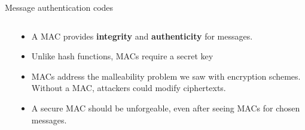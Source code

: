 \documentclass[aspectratio=169, lualatex, handout]{beamer}
\begin{document}
\begin{frame}{Message authentication codes}
	\begin{columns}[c]
		\begin{column}{0.5\textwidth}
		\end{column}
		\begin{column}{0.5\textwidth}
			\begin{itemize}
				\item A MAC provides \textbf{integrity} and \textbf{authenticity} for messages.
				\item Unlike hash functions, MACs require a secret key
				\item MACs address the malleability problem we saw with encryption schemes. Without a MAC, attackers could modify ciphertexts.
				\item A secure MAC should be unforgeable, even after seeing MACs for chosen messages.
			\end{itemize}
		\end{column}
	\end{columns}
\end{frame}
\end{document}
